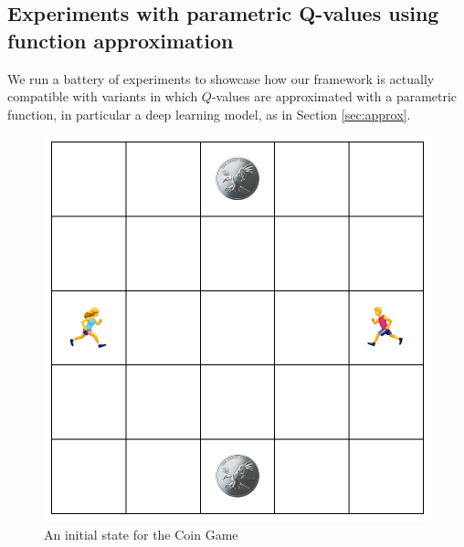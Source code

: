 





\subsection{Experiments with parametric Q-values using function approximation}\label{sec:cg}

We run a battery of experiments to showcase 
how our framework is actually compatible with variants in which $Q$-values are approximated with a parametric function, in particular a deep learning model, as in Section \ref{sec:approx}.

\begin{figure}[h]
\centering
\includegraphics[scale=0.3]{figures/game5x5.png}%
\caption{An initial state for the Coin Game}\label{fig:coingame}
\end{figure}

